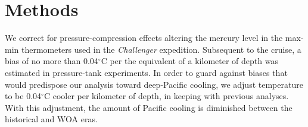 \documentclass[12pt]{article}
\begin{document}

\section{Methods}


We correct for pressure-compression effects altering the mercury level
in the max-min thermometers used in the {\it Challenger} expedition.
Subsequent to the cruise, a bias of no more than 0.04$^\circ$C per the
equivalent of a kilometer of depth was estimated in pressure-tank
experiments\cite{Tait--1882:Pressure}. In order to guard against
biases that would predispose our analysis toward deep-Pacific cooling,
we adjust temperature to be 0.04$^\circ$C cooler per kilometer of
depth, in keeping with previous
analyses\cite{Roemmich-Gould-2012:135}. With this adjustment, the
amount of Pacific cooling is diminished between the historical and WOA
eras.
\end{document}
